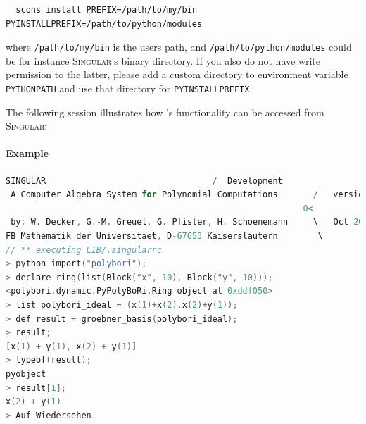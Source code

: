 \begin{lstlisting}
  scons install PREFIX=/path/to/my/bin PYINSTALLPREFIX=/path/to/python/modules
\end{lstlisting}

where \texttt{/path/to/my/bin} is the users path, and \texttt{/path/to/python/modules}
could be for instance \textsc{Singular}'s binary directory. If you also do not have write
permission to the latter, please add a custom directory to environment
variable \texttt{PYTHONPATH} and use that directory for \texttt{PYINSTALLPREFIX}.

The following session illustrates how \PolyBoRi's functionality can be accessed
from \textsc{Singular}:

\paragraph{Example}
\begin{lstlisting}[language=C]
                     SINGULAR                                 /  Development
 A Computer Algebra System for Polynomial Computations       /   version 3-1-2
                                                           0<
 by: W. Decker, G.-M. Greuel, G. Pfister, H. Schoenemann     \   Oct 2010
FB Mathematik der Universitaet, D-67653 Kaiserslautern        \
// ** executing LIB/.singularrc
> python_import("polybori");
> declare_ring(list(Block("x", 10), Block("y", 10)));
<polybori.dynamic.PyPolyBoRi.Ring object at 0xddf050>
> list polybori_ideal = (x(1)+x(2),x(2)+y(1));
> def result = groebner_basis(polybori_ideal);
> result;
[x(1) + y(1), x(2) + y(1)]
> typeof(result);
pyobject
> result[1];
x(2) + y(1)
> Auf Wiedersehen.
\end{lstlisting}


